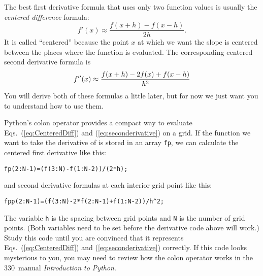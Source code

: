
The best first derivative formula that uses only two function values
is usually the {\it centered difference} formula: 
\begin{equation}\label{eq:CenteredDiff}
    f'(x) \approx \frac{f(x+h)-f(x-h)}{2h} .
\end{equation}
It is called ``centered'' because the point $x$ at which we want the
slope is centered between the places where the function is evaluated.
The corresponding centered second derivative formula is 
\begin{equation}\label{eq:seconderivative}
    f''(x) \approx {f(x+h)-2 f(x)+f(x-h) \over h^2}
\end{equation}
You will derive both of these formulas a little later, but for now we
just want you to understand how to use them.

Python's colon operator provides a compact way to evaluate
Eqs.~(\ref{eq:CenteredDiff}) and (\ref{eq:seconderivative}) on a
grid.  If the function we want to take the derivative of is stored in
an array {\tt fp}, we can calculate the centered first derivative like this:
\begin{Verbatim}
fp(2:N-1)=(f(3:N)-f(1:N-2))/(2*h);
\end{Verbatim}
and second derivative formulas at each interior grid point like this:
\begin{Verbatim}
fpp(2:N-1)=(f(3:N)-2*f(2:N-1)+f(1:N-2))/h^2;
\end{Verbatim}
The variable {\tt h} is the spacing between grid points and {\tt N}
is the number of grid points. (Both variables need to be set before
the derivative code above will work.) Study this code until you are
convinced that it represents Eqs.~(\ref{eq:CenteredDiff}) and
(\ref{eq:seconderivative}) correctly. If this code looks mysterious
to you, you may need to review how the colon operator works in the
330~manual \emph{Introduction to Python}.


